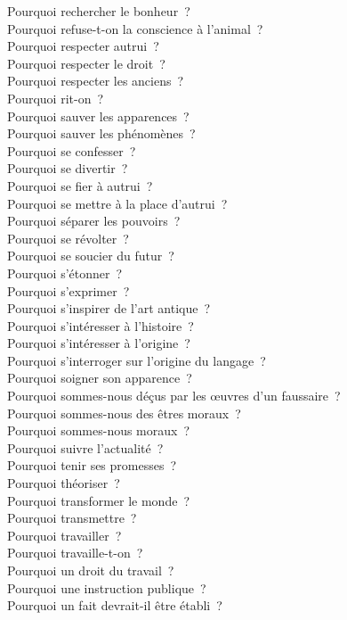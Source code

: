 \documentclass[a4paper,12pt]{article}
\begin{document}
Pourquoi rechercher le bonheur ? \\
Pourquoi refuse-t-on la conscience à l'animal ? \\
Pourquoi respecter autrui ? \\
Pourquoi respecter le droit ? \\
Pourquoi respecter les anciens ? \\
Pourquoi rit-on ? \\
Pourquoi sauver les apparences ? \\
Pourquoi sauver les phénomènes ? \\
Pourquoi se confesser ? \\
Pourquoi se divertir ? \\
Pourquoi se fier à autrui ? \\
Pourquoi se mettre à la place d'autrui ? \\
Pourquoi séparer les pouvoirs ? \\
Pourquoi se révolter ? \\
Pourquoi se soucier du futur ? \\
Pourquoi s'étonner ? \\
Pourquoi s'exprimer ? \\
Pourquoi s'inspirer de l'art antique ? \\
Pourquoi s'intéresser à l'histoire ? \\
Pourquoi s'intéresser à l'origine ? \\
Pourquoi s'interroger sur l'origine du langage ? \\
Pourquoi soigner son apparence ? \\
Pourquoi sommes-nous déçus par les œuvres d'un faussaire ? \\
Pourquoi sommes-nous des êtres moraux ? \\
Pourquoi sommes-nous moraux ? \\
Pourquoi suivre l'actualité ? \\
Pourquoi tenir ses promesses ? \\
Pourquoi théoriser ? \\
Pourquoi transformer le monde ? \\
Pourquoi transmettre ? \\
Pourquoi travailler ? \\
Pourquoi travaille-t-on ? \\
Pourquoi un droit du travail ? \\
Pourquoi une instruction publique ? \\
Pourquoi un fait devrait-il être établi ? \\
\end{document}
